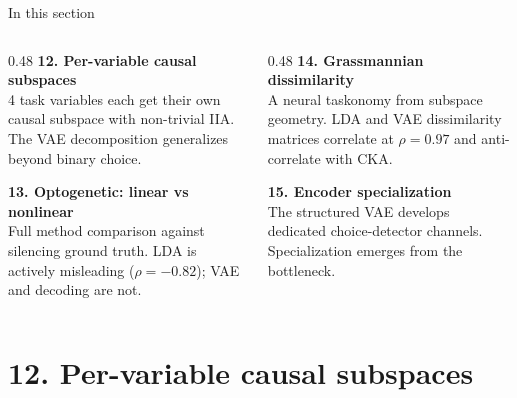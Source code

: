\documentclass[aspectratio=169,11pt]{beamer}
\begin{document}
\begin{frame}{In this section}
\begin{columns}[T]
\begin{column}{0.48\textwidth}
\textbf{12. Per-variable causal subspaces}\\[0.2em]
{\small 4 task variables each get their own causal subspace with non-trivial IIA. The VAE decomposition generalizes beyond binary choice.}

\vspace{0.6em}
\textbf{13. Optogenetic: linear vs nonlinear}\\[0.2em]
{\small Full method comparison against silencing ground truth. LDA is actively misleading ($\rho = -0.82$); VAE and decoding are not.}
\end{column}
\begin{column}{0.48\textwidth}
\textbf{14. Grassmannian dissimilarity}\\[0.2em]
{\small A neural taskonomy from subspace geometry. LDA and VAE dissimilarity matrices correlate at $\rho = 0.97$ and anti-correlate with CKA.}

\vspace{0.6em}
\textbf{15. Encoder specialization}\\[0.2em]
{\small The structured VAE develops dedicated choice-detector channels. Specialization emerges from the bottleneck.}
\end{column}
\end{columns}
\end{frame}

\section{12. Per-variable causal subspaces}
\end{document}
